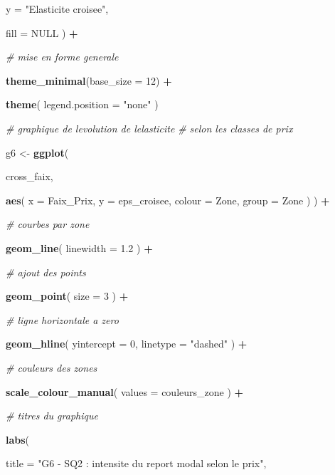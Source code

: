 \documentclass[
]{article}
\newenvironment{Shaded}{\begin{snugshade}}{\end{snugshade}}
\newcommand{\AttributeTok}[1]{\textcolor[rgb]{0.13,0.29,0.53}{#1}}
\newcommand{\CommentTok}[1]{\textcolor[rgb]{0.56,0.35,0.01}{\textit{#1}}}
\newcommand{\ConstantTok}[1]{\textcolor[rgb]{0.56,0.35,0.01}{#1}}
\newcommand{\DecValTok}[1]{\textcolor[rgb]{0.00,0.00,0.81}{#1}}
\newcommand{\FloatTok}[1]{\textcolor[rgb]{0.00,0.00,0.81}{#1}}
\newcommand{\FunctionTok}[1]{\textcolor[rgb]{0.13,0.29,0.53}{\textbf{#1}}}
\newcommand{\NormalTok}[1]{#1}
\newcommand{\OtherTok}[1]{\textcolor[rgb]{0.56,0.35,0.01}{#1}}
\newcommand{\SpecialCharTok}[1]{\textcolor[rgb]{0.81,0.36,0.00}{\textbf{#1}}}
\newcommand{\StringTok}[1]{\textcolor[rgb]{0.31,0.60,0.02}{#1}}
\begin{document}
\begin{Shaded}
\begin{Highlighting}[]
    \AttributeTok{y =} \StringTok{"Elasticite croisee"}\NormalTok{,}

    \AttributeTok{fill =} \ConstantTok{NULL}
\NormalTok{  ) }\SpecialCharTok{+}

  \CommentTok{\# mise en forme generale}

  \FunctionTok{theme\_minimal}\NormalTok{(}\AttributeTok{base\_size =} \DecValTok{12}\NormalTok{) }\SpecialCharTok{+}

  \FunctionTok{theme}\NormalTok{(}
    \AttributeTok{legend.position =} \StringTok{"none"}
\NormalTok{  )}


\CommentTok{\# graphique de l\textquotesingle{}evolution de l\textquotesingle{}elasticite}
\CommentTok{\# selon les classes de prix}

\NormalTok{g6 }\OtherTok{\textless{}{-}} \FunctionTok{ggplot}\NormalTok{(}

\NormalTok{  cross\_faix,}

  \FunctionTok{aes}\NormalTok{(}
    \AttributeTok{x =}\NormalTok{ Faix\_Prix,}
    \AttributeTok{y =}\NormalTok{ eps\_croisee,}
    \AttributeTok{colour =}\NormalTok{ Zone,}
    \AttributeTok{group =}\NormalTok{ Zone}
\NormalTok{  )}
\NormalTok{) }\SpecialCharTok{+}

  \CommentTok{\# courbes par zone}

  \FunctionTok{geom\_line}\NormalTok{(}
    \AttributeTok{linewidth =} \FloatTok{1.2}
\NormalTok{  ) }\SpecialCharTok{+}

  \CommentTok{\# ajout des points}

  \FunctionTok{geom\_point}\NormalTok{(}
    \AttributeTok{size =} \DecValTok{3}
\NormalTok{  ) }\SpecialCharTok{+}

  \CommentTok{\# ligne horizontale a zero}

  \FunctionTok{geom\_hline}\NormalTok{(}
    \AttributeTok{yintercept =} \DecValTok{0}\NormalTok{,}
    \AttributeTok{linetype =} \StringTok{"dashed"}
\NormalTok{  ) }\SpecialCharTok{+}

  \CommentTok{\# couleurs des zones}

  \FunctionTok{scale\_colour\_manual}\NormalTok{(}
    \AttributeTok{values =}\NormalTok{ couleurs\_zone}
\NormalTok{  ) }\SpecialCharTok{+}

  \CommentTok{\# titres du graphique}

  \FunctionTok{labs}\NormalTok{(}

    \AttributeTok{title =} \StringTok{"G6 {-} SQ2 : intensite du report modal selon le prix"}\NormalTok{,}


\end{Highlighting}
\end{Shaded}
\end{document}
